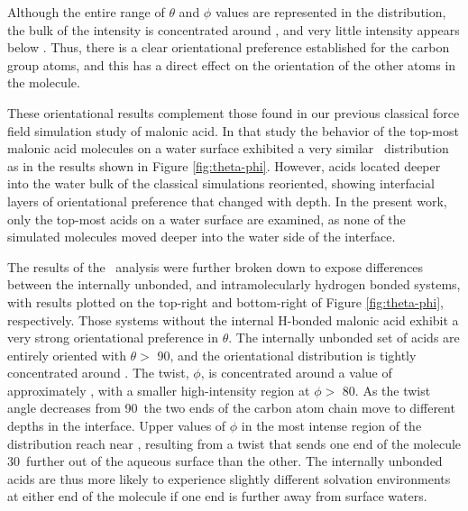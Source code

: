 Although the entire range of $\theta$ and $\phi$ values are represented in the distribution, the bulk of the intensity is concentrated around \degr, and very little intensity appears below \degr. Thus, there is a clear orientational preference established for the carbon group atoms, and this has a direct effect on the orientation of the other atoms in the molecule.

These orientational results complement those found in our previous classical force field simulation study of malonic acid.\cite{Blower2012} In that study the behavior of the top-most malonic acid molecules on a water surface exhibited a very similar \thetaphi~distribution as in the results shown in Figure \ref{fig:theta-phi}. However, acids located deeper into the water bulk of the classical simulations reoriented, showing interfacial layers of orientational preference that changed with depth. In the present work, only the top-most acids on a water surface are examined, as none of the simulated molecules moved deeper into the water side of the interface.

The results of the \thetaphi~analysis were further broken down to expose differences between the internally unbonded, and intramolecularly hydrogen bonded systems, with results plotted on the top-right and bottom-right of Figure \ref{fig:theta-phi}, respectively. Those systems without the internal H-bonded malonic acid exhibit a very strong orientational preference in $\theta$. The internally unbonded set of acids are entirely oriented with $\theta >$ 90\degr, and the orientational distribution is tightly concentrated around \degr. The twist, $\phi$, is concentrated around a value of approximately \degr, with a smaller high-intensity region at $\phi >$ 80\degr. As the twist angle decreases from 90\degr~the two ends of the carbon atom chain move to different depths in the interface. Upper values of $\phi$ in the most intense region of the distribution reach near \degr, resulting from a twist that sends one end of the molecule 30\degr~further out of the aqueous surface than the other. The internally unbonded acids are thus more likely to experience slightly different solvation environments at either end of the molecule if one end is further away from surface waters.

